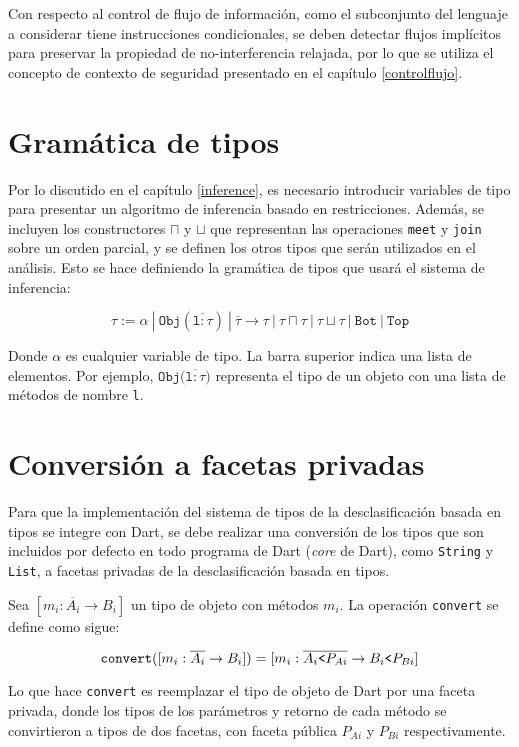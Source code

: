 Con respecto al control de flujo de información, como el subconjunto del lenguaje a considerar tiene instrucciones condicionales, se deben detectar flujos implícitos para preservar la propiedad de no-interferencia relajada, por lo que se utiliza el concepto de contexto de seguridad presentado en el capítulo \ref{controlflujo}.
\clearpage
\section{Gramática de tipos}
Por lo discutido en el capítulo \ref{inference}, es necesario introducir variables de tipo para presentar un algoritmo de inferencia basado en restricciones. Además, se incluyen los constructores $\sqcap$ y $\sqcup$ que representan las operaciones \texttt{meet} y \texttt{join} sobre un orden parcial, y se definen los otros tipos que serán utilizados en el análisis. Esto se hace definiendo la gramática de tipos que usará el sistema de inferencia:

  \[\mathtt{\tau := \alpha\ |\ Obj(\overline{l: \tau})\ |\ \overline{\tau} \rightarrow \tau \ |\ \tau \sqcap \tau\ |\ \tau \sqcup \tau\ |\ Bot\ |\ Top}\]

Donde $\alpha$ es cualquier variable de tipo. La barra superior indica una lista de elementos. Por ejemplo, $\mathtt{Obj(\overline{l: \tau}})$ representa el tipo de un objeto con una lista de métodos de nombre \texttt{l}.

\section{Conversión a facetas privadas} \label{conv}
Para que la implementación del sistema de tipos de la desclasificación basada en tipos se integre con Dart, se debe realizar una conversión de los tipos que son incluidos por defecto en todo programa de Dart (\emph{core} de Dart), como \texttt{String} y \texttt{List}, a facetas privadas de la desclasificación basada en tipos.

Sea $[m_i: \overline{A_i} \rightarrow B_i]$ un tipo de objeto con métodos $m_i$. La operación \texttt{convert} se define como sigue:

\[
\mathtt{convert}([m_i: \overline{A_i} \rightarrow B_i]) = [m_i: \overline{A_i\text{\texttt{<}}P_{Ai}} \rightarrow B_i\text{\texttt{<}}P_{Bi}]
\]

Lo que hace \texttt{convert} es reemplazar el tipo de objeto de Dart por una faceta privada, donde los tipos de los parámetros y retorno de cada método se convirtieron a tipos de dos facetas, con faceta pública $P_{Ai}$ y $P_{Bi}$ respectivamente.

